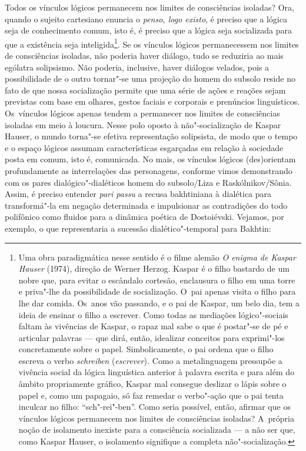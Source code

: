 Todos os vínculos lógicos permanecem nos limites de consciências
isoladas? Ora, quando o sujeito cartesiano enuncia o \emph{penso, logo
existo}, é preciso que a lógica seja de conhecimento comum, isto é, é
preciso que a lógica seja socializada para que a existência seja
inteligida\footnote{Uma obra paradigmática nesse sentido é o filme
  alemão \emph{O enigma de Kaspar Hauser} (1974), direção de Werner
  Herzog. Kaspar é o filho bastardo de um nobre que, para evitar o
  escândalo cortesão, enclausura o filho em uma torre e priva"-lhe da
  possibilidade de socialização. O~pai apenas visita o filho para lhe
  dar comida. Os~anos vão passando, e o pai de Kaspar, um belo dia, tem
  a ideia de ensinar o filho a escrever. Como todas as mediações
  lógico"-sociais faltam às vivências de Kaspar, o rapaz mal sabe o que é
  postar"-se de pé e articular palavras --- que dirá, então, idealizar
  conceitos para exprimi"-los concretamente sobre o papel.
  Simbolicamente, o pai ordena que o filho escreva o verbo
  \emph{schreiben} (\emph{escrever})\emph{.} Como a metalinguagem
  pressupõe a vivência social da lógica linguística anterior à palavra
  escrita e para além do âmbito propriamente gráfico, Kaspar mal
  consegue deslizar o lápis sobre o papel e, como um papagaio, só faz
  remedar o verbo"-ação que o pai tenta inculcar no filho:
  ``sch"-rei"-ben''. Como seria possível, então, afirmar que os vínculos
  lógicos permanecem nos limites de consciências isoladas? A~própria
  noção de isolamento inexiste para a consciência socializada --- a não
  ser que, como Kaspar Hauser, o isolamento signifique a completa
  não"-socialização.}. Se os vínculos lógicos permanecessem nos limites
de consciências isoladas, não poderia haver diálogo, tudo se reduziria
ao mais ególatra solipsismo. Não poderia, inclusive, haver diálogos
velados, pois a possibilidade de o outro tornar"-se uma projeção do homem
do subsolo reside no fato de que nossa socialização permite que uma
série de ações e reações sejam previstas com base em olhares, gestos
faciais e corporais e prenúncios linguísticos. Os~vínculos lógicos
apenas tendem a permanecer nos limites de consciências isoladas em meio
à loucura. Nesse polo oposto à não"-socialização de Kaspar Hauser, o
mundo torna"-se efetiva representação solipsista, de modo que o tempo e o
espaço lógicos assumam características esgarçadas em relação à sociedade
posta em comum, isto é, comunicada. No mais, os vínculos lógicos
(des)orientam profundamente as interrelações das personagens, conforme
vimos demonstrando com os pares dialógico"-dialéticos homem do
subsolo/Liza e Raskólnikov/Sônia. Assim, é preciso entender \emph{pari
passu} a recusa bakhtiniana à dialética para transformá"-la em negação
determinada e impulsionar as contradições do todo polifônico como
fluidos para a dinâmica poética de Dostoiévski. Vejamos, por exemplo, o
que representaria a sucessão dialético"-temporal para Bakhtin:

